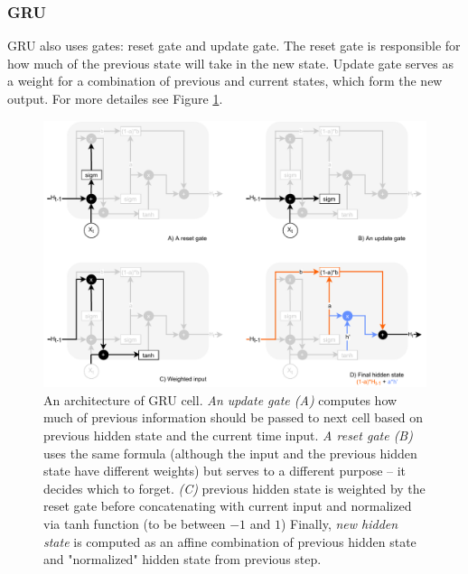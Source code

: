 \subsubsection*{GRU}
GRU also uses gates: reset gate and update gate.
The reset gate is responsible for how much of the previous state will take in the new state. Update gate serves as a weight for a combination of previous and current states, which form the new output. For more detailes see Figure \ref{pic:gru_gates}.
\begin{figure}[H]
\centering
\includegraphics[width=1\columnwidth]{../img/gru_gates}
\protect\caption{An architecture of GRU cell. \textit{An update gate (A)} computes how much of previous information should be passed to next cell based on previous hidden state and the current time input. \textit{A reset gate (B)} uses the same formula (although the input and the previous hidden state have different weights) but serves to a different purpose -- it decides which to forget. \textit{(C)} previous hidden state is weighted by the reset gate before concatenating with current input and normalized via tanh function (to be between $-1$ and $1$) Finally, \textit{new hidden state} is computed as an affine combination of previous hidden state and "normalized" hidden state from previous step.}
\label{pic:gru_gates}
\end{figure}
